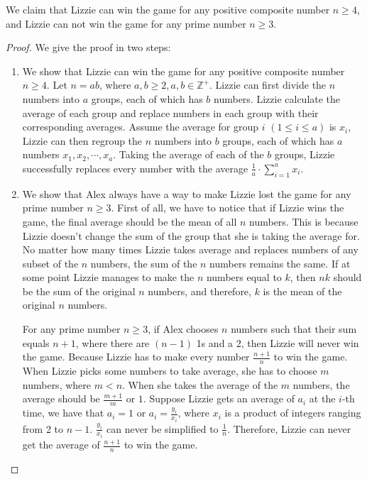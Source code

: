 \documentclass[11pt, oneside]{article}   	%
\begin{document}
We claim that Lizzie can win the game for any positive composite number $n\ge 4$, and Lizzie can not win the game for any prime number $n\ge 3$.
\begin{proof}
We give the proof in two steps:
\begin{enumerate}
\item We show that Lizzie can win the game for any positive composite number $n\ge 4$. Let $n=ab$, where $ a, b\ge 2, a, b\in \mathbb{Z^+}$. Lizzie can first divide the $n$ numbers into $a$ groups, each of which has $b$ numbers. Lizzie calculate the average of each group and replace numbers in each group with their corresponding averages. Assume the average for group $i$ $(1\le i \le a)$ is $x_i$, Lizzie can then regroup the $n$ numbers into $b$ groups, each of which has $a$ numbers $x_1, x_2,\cdots, x_a$. Taking the average of each of the $b$ groups, Lizzie successfully replaces every number with the average $\frac{1}{a}\cdot\sum^a_{i=1} x_i$.

\item We show that Alex always have a way to make Lizzie lost the game for any prime number $n\ge 3$. First of all, we have to notice that if Lizzie wins the game, the final average should be the mean of all $n$ numbers. This is because Lizzie doesn't change the sum of the group that she is taking the average for. No matter how many times Lizzie takes average and replaces numbers of any subset of the $n$ numbers, the sum of the $n$ numbers remains the same. If at some point Lizzie manages to make the $n$ numbers equal to $k$, then $nk$ should be the sum of the original $n$ numbers, and therefore, $k$ is the mean of the original $n$ numbers.

For any prime number $n\ge 3$, if Alex chooses $n$ numbers such that their sum equals $n+1$, where there are $(n-1)$ 1s and a 2,  then Lizzie will never win the game. Because Lizzie has to make every number $\frac{n+1}{n}$ to win the game. When Lizzie picks some numbers to take average, she has to choose $m$ numbers, where $m<n$. When she takes the average of the $m$ numbers, the average should be $\frac{m+1}{m}$ or $1$.  Suppose Lizzie gets an average of $a_i$ at the $i$-th time, we have that $a_i=1$ or $a_i=\frac{y_i}{x_i}$, where $x_i$ is a product of integers ranging from 2 to $n-1$. $\frac{y_i}{x_i}$ can never be simplified to $\frac{1}{n}$. Therefore, Lizzie can never get the average of $\frac{n+1}{n}$ to win the game.
\end{enumerate}






\end{proof}
\end{document}
